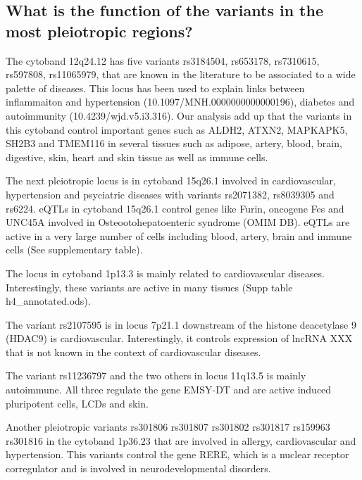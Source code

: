 \subsection*{What is the function of the variants in the most pleiotropic regions?}


The cytoband 12q24.12 has five variants rs3184504, rs653178, rs7310615, rs597808, rs11065979, that are known in the literature to be associated to a wide palette of diseases.
This locus has been used to explain links between inflammaiton and hypertension (10.1097/MNH.0000000000000196), diabetes and autoimmunity (10.4239/wjd.v5.i3.316).
%
Our analysis add up that the variants in this cytoband control important genes such as ALDH2, ATXN2, MAPKAPK5, SH2B3 and TMEM116 in several tissues such as adipose, artery, blood, brain, digestive, skin, heart and skin tissue as well as immune cells.


The next pleiotropic locus is in cytoband 15q26.1 involved in cardiovascular, hypertension and psyciatric diseases with variants rs2071382, rs8039305 and rs6224.
%
eQTLs in cytoband 15q26.1 control genes like Furin, oncogene Fes and UNC45A involved in Osteootohepatoenteric syndrome (OMIM DB).
%
eQTLs are active in a very large number of cells including blood, artery, brain and immune cells (See supplementary table).

The locus in cytoband 1p13.3 is mainly related to cardiovascular diseases.
Interestingly, these variants are active in many tissues (Supp table h4_annotated.ods).



The variant rs2107595 is in locus 7p21.1 downstream of the histone deacetylase 9 (HDAC9) is cardiovascular. Interestingly, it controls expression of lncRNA XXX that is not known in the context of cardiovascular diseases.

The variant rs11236797 and the two others in locus 11q13.5 is mainly autoimmune.
All three regulate the gene EMSY-DT and are active induced pluripotent cells, LCDs and skin.

Another pleiotropic variants rs301806
rs301807
rs301802
rs301817
rs159963
rs301816
in the cytoband 1p36.23 that are involved in allergy, cardiovascular and hypertension.
This variants control the gene RERE, which is a nuclear receptor corregulator and is involved in neurodevelopmental disorders.\\

